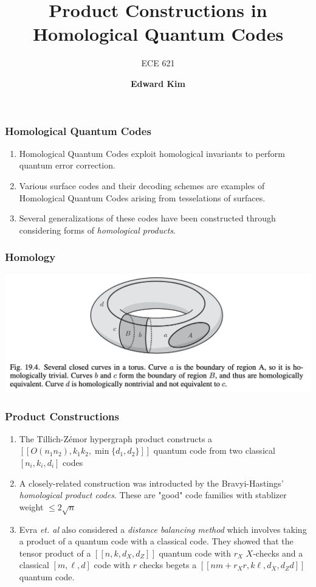 \documentclass{beamer}
\title{\textbf{Product Constructions in Homological Quantum Codes}}
\subtitle{
ECE 621}
\author{\textbf{Edward Kim}}
\begin{document}
\begin{frame}
\titlepage
\end{frame}

\begin{frame}
  \frametitle{\textbf{Homological Quantum Codes}}
          \begin{enumerate}
            \item Homological Quantum Codes exploit homological invariants to perform quantum error correction.
              \item Various surface codes and their decoding schemes are examples of Homological Quantum Codes arising from tesselations of surfaces. 
              \item Several generalizations of these codes have been constructed through considering forms of \emph{homological products}.               
  
         \end{enumerate}
\end{frame}

\begin{frame}
    \frametitle{\textbf{Homology}}
    \includegraphics[scale=0.5 ]{torus}
\end{frame}

\begin{frame}
  \frametitle{\textbf{Product Constructions}}

\begin{enumerate}
  \item  The Tillich-Zémor hypergraph product constructs a $[[O(n_1n_2), k_1k_2 , \min\{d_1 , d_2\}]]$ quantum code from two classical $[n_i, k_i, d_i]$ codes 
  \item A closely-related construction was introducted by the Bravyi-Hastings' \emph{homological product codes}. These are "good" code families with stablizer weight $\leq 2\sqrt{n}$
\item Evra \textit{et. al} also considered a \emph{distance balancing method} which involves taking a product of a quantum code with a classical code. They showed that the tensor product of a $[[n, k, d_X , d_Z ]]$ quantum code with $r_X$ $X$-checks and a classical $[m, \ell, d]$ code
with $r$ checks begets a $[[nm + r_Xr, k\ell, d_X , d_Z d]]$ quantum
code.
\end{enumerate}
\end{frame}
\end{document}
